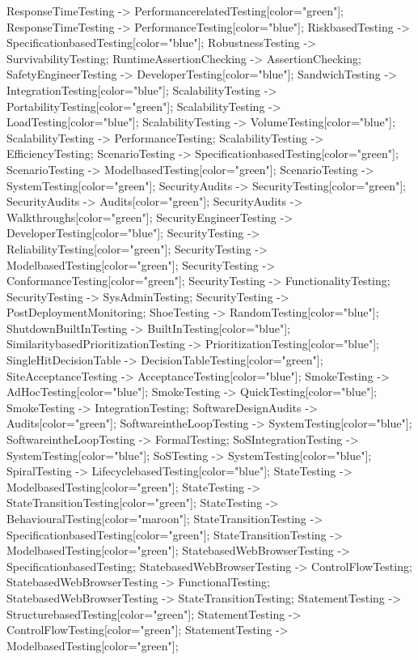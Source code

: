 \documentclass{article}
\begin{document}
{ResponseTimeTesting -> PerformancerelatedTesting[color="green"];
ResponseTimeTesting -> PerformanceTesting[color="blue"];
RiskbasedTesting -> SpecificationbasedTesting[color="blue"];
RobustnessTesting -> SurvivabilityTesting;
RuntimeAssertionChecking -> AssertionChecking;
SafetyEngineerTesting -> DeveloperTesting[color="blue"];
SandwichTesting -> IntegrationTesting[color="blue"];
ScalabilityTesting -> PortabilityTesting[color="green"];
ScalabilityTesting -> LoadTesting[color="blue"];
ScalabilityTesting -> VolumeTesting[color="blue"];
ScalabilityTesting -> PerformanceTesting;
ScalabilityTesting -> EfficiencyTesting;
ScenarioTesting -> SpecificationbasedTesting[color="green"];
ScenarioTesting -> ModelbasedTesting[color="green"];
ScenarioTesting -> SystemTesting[color="green"];
SecurityAudits -> SecurityTesting[color="green"];
SecurityAudits -> Audits[color="green"];
SecurityAudits -> Walkthroughs[color="green"];
SecurityEngineerTesting -> DeveloperTesting[color="blue"];
SecurityTesting -> ReliabilityTesting[color="green"];
SecurityTesting -> ModelbasedTesting[color="green"];
SecurityTesting -> ConformanceTesting[color="green"];
SecurityTesting -> FunctionalityTesting;
SecurityTesting -> SysAdminTesting;
SecurityTesting -> PostDeploymentMonitoring;
ShoeTesting -> RandomTesting[color="blue"];
ShutdownBuiltInTesting -> BuiltInTesting[color="blue"];
SimilaritybasedPrioritizationTesting -> PrioritizationTesting[color="blue"];
SingleHitDecisionTable -> DecisionTableTesting[color="green"];
SiteAcceptanceTesting -> AcceptanceTesting[color="blue"];
SmokeTesting -> AdHocTesting[color="blue"];
SmokeTesting -> QuickTesting[color="blue"];
SmokeTesting -> IntegrationTesting;
SoftwareDesignAudits -> Audits[color="green"];
SoftwareintheLoopTesting -> SystemTesting[color="blue"];
SoftwareintheLoopTesting -> FormalTesting;
SoSIntegrationTesting -> SystemTesting[color="blue"];
SoSTesting -> SystemTesting[color="blue"];
SpiralTesting -> LifecyclebasedTesting[color="blue"];
StateTesting -> ModelbasedTesting[color="green"];
StateTesting -> StateTransitionTesting[color="green"];
StateTesting -> BehaviouralTesting[color="maroon"];
StateTransitionTesting -> SpecificationbasedTesting[color="green"];
StateTransitionTesting -> ModelbasedTesting[color="green"];
StatebasedWebBrowserTesting -> SpecificationbasedTesting;
StatebasedWebBrowserTesting -> ControlFlowTesting;
StatebasedWebBrowserTesting -> FunctionalTesting;
StatebasedWebBrowserTesting -> StateTransitionTesting;
StatementTesting -> StructurebasedTesting[color="green"];
StatementTesting -> ControlFlowTesting[color="green"];
StatementTesting -> ModelbasedTesting[color="green"];
}
\end{document}
